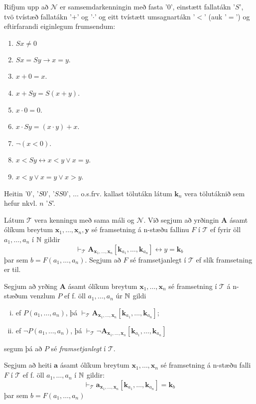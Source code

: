 \documentclass[12pt]{book}
\newcommand{\cT}{\mathcal{T}}
\newcommand{\cN}{\mathcal{N}}
\newcommand{\mb}[1]{\mathbf{#1}}
\newcommand{\bA}{\mathbf{A}}
\newcommand{\ba}{\mathbf{a}}
\newcommand{\bx}{\mathbf{x}}
\newcommand{\bk}{\mathbf{k}}
\newcommand{\bxxn}{\bx_1, \dotsc, \bx_n}
\newcommand{\aan}{a_1, \dotsc, a_n}
\begin{document}
Rifjum upp að $\cN$ er samsemdarkenningin með fasta '$0$', einstætt
fallatákn '$S$', tvö tvístæð fallatákn '$+$' og '$\cdot$' og
eitt tvístætt umsagnartákn '$<$' (auk '$=$') og eftirfarandi eiginlegum
frumsendum:

\begin{enumerate}[label=\textbf{N}\arabic*]
\item  \( Sx \neq 0\)
\item  $ Sx = Sy \rightarrow x = y$.
\item  $ x + 0 = x$.
\item  $ x + Sy = S(x+y)$.
\item  $ x \cdot 0 = 0$.
\item  $ x \cdot Sy = (x \cdot y) + x$.
\item  $ \lnot (x < 0)$.
\item  $ x < Sy \leftrightarrow x < y \vee x = y$.
\item  $ x < y \vee x = y \vee x > y$.
\end{enumerate}

Heitin '$0$', '$S0$', '$SS0$', $\dotsc$ o.s.frv. kallast
tölutákn látum $\mb{k}_n$ vera tölutáknið sem hefur nkvl. $n$ '$S$'.

\begin{skgr}
  Látum $\cT$ vera kenningu með sama máli og $\cN$. Við segjum
  að yrðingin $\bA$ ásamt ólíkum breytum 
  $\bx_1, \dotsc, \bx_n ,\mathbf{y}$ sé framsetning á n-stæðu fallinu
 $F$ í $\cT$ ef fyrir öll $a_1, \dotsc, a_n$ í $\mathbb{N}$ gildir
 \[ \vdash_{\cT} \bA_{\bx_1, \dotsc, \bx_n} [ \bk_{a_1}, \dotsc, \bk_{a_n}] \leftrightarrow y = \bk_b \]
 þar sem $ b = F( a_1, \dotsc, a_n)$. Segjum að $F$ sé framsetjanlegt í
 $\cT$ ef slík framsetning er til.

 Segjum að yrðing $\bA$ ásamt ólíkum breytum $\bxxn$ sé framsetning í $\cT$
 á n-stæðum venzlum $P$ ef f. öll $\aan$ úr $\mathbb{N}$ gildi
 \begin{enumerate}[(i)]
 \item  ef $P(\aan)$, þá $\vdash_{\cT} \bA_{\bxxn}[\bk_{a_1}, \dotsc, \bk_{a_n}]$;
 \item  ef $\lnot P(\aan)$, þá $\vdash_{\cT} \lnot \bA_{\bxxn}[\bk_{a_1}, \dotsc, \bk_{a_n}]$
 \end{enumerate}
 segum þá að $P$ sé \emph{framsetjanlegt} í $\cT$.

 Segjum að heiti $\ba$ ásamt ólíkum breytum $\bxxn$ sé framsetning á 
 n-stæðu falli $F$ í $\cT$ ef f. öll $\aan$ í $\mathbb{N}$
 gildir:
 \[ \vdash_{\cT} \ba_{\bxxn}[\bk_{a_1}, \dotsc, \bk_{a_n}] = \bk_b \]
 þar sem $b = F(\aan)$
\end{skgr}
\end{document}

